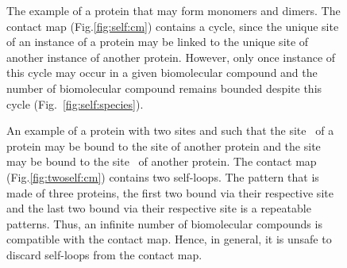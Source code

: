 \documentclass{entcs}
\begin{document}
\begin{figure}
\caption{The example of a protein that may form monomers and dimers.
The contact map (Fig.\ref{fig:self:cm}) contains a cycle, since the unique site of an instance of a  protein may be linked to the unique site of another instance of another protein. However, only once instance of this cycle may occur in a given biomolecular compound and the number of biomolecular compound remains bounded despite this cycle (Fig.~\ref{fig:self:species}).}
\end{figure}

\begin{figure}
\caption{An example of a protein with two sites  and  such that the site  of a protein may be bound to the site  of another protein and the site  may be bound to the site  of another protein.
The contact map (Fig.\ref{fig:twoself:cm}) contains two self-loops.
The pattern that is made of three proteins, the first two bound via their respective site  and the last two bound via their respective site
 is a repeatable patterns. Thus, an infinite number of biomolecular compounds is compatible with the contact map. Hence, in general, it is unsafe to discard self-loops from the contact map. }
\end{figure}
\end{document}
